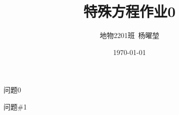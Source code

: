 \documentclass[12pt]{ctexart}
\title{特殊方程作业0}
\author{地物2201班\ 杨曜堃}
\date{\today}
\begin{document}
    \markboth{\theauthor}{\thetitle}
    \maketitle
    \begin{description}
        \item[问题0] 
    \end{description}
    
    \begin{problem}{问题\#1}
        
    \end{problem}
\end{document}
